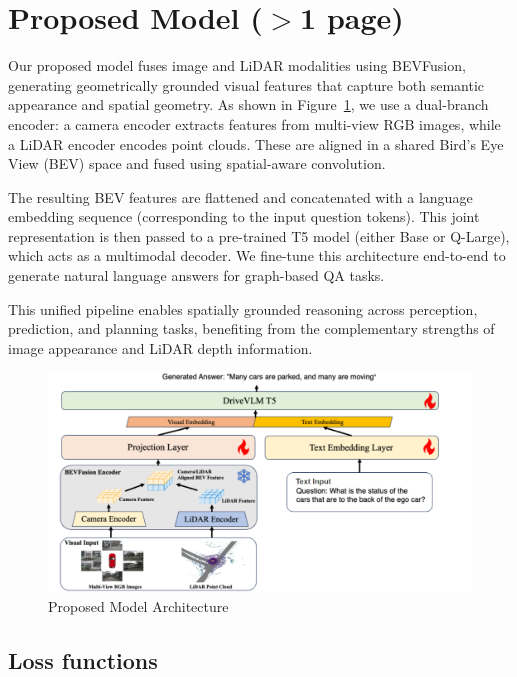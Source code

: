 \documentclass{article} %
\begin{document}
\clearpage
\section{ Proposed Model ($>$1 page)}
Our proposed model fuses image and LiDAR modalities using BEVFusion, generating geometrically grounded visual features that capture both semantic appearance and spatial geometry. As shown in Figure~\ref{fig:drivelm-arch}, we use a dual-branch encoder: a camera encoder extracts features from multi-view RGB images, while a LiDAR encoder encodes point clouds. These are aligned in a shared Bird's Eye View (BEV) space and fused using spatial-aware convolution.

The resulting BEV features are flattened and concatenated with a language embedding sequence (corresponding to the input question tokens). This joint representation is then passed to a pre-trained T5 model (either Base or Q-Large), which acts as a multimodal decoder. We fine-tune this architecture end-to-end to generate natural language answers for graph-based QA tasks.

This unified pipeline enables spatially grounded reasoning across perception, prediction, and planning tasks, benefiting from the complementary strengths of image appearance and LiDAR depth information.

\begin{figure}[H]
    \centering
    \includegraphics[width=0.95\linewidth]{Figures/proposed_model_arch.png}
    \caption{Proposed Model Architecture}
    \label{fig:drivelm-arch}
\end{figure}

\subsection{Loss functions}
\end{document}
